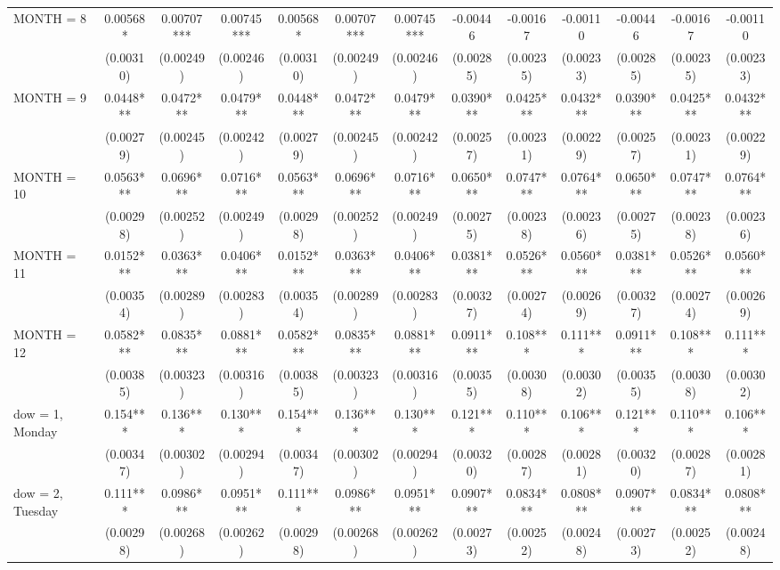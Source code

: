 \begin{tabular}{lcccccccccccc}
MONTH = 8 & 0.00568* & 0.00707*** & 0.00745*** & 0.00568* & 0.00707*** & 0.00745*** & -0.00446 & -0.00167 & -0.00110 & -0.00446 & -0.00167 & -0.00110 \\
 & (0.00310) & (0.00249) & (0.00246) & (0.00310) & (0.00249) & (0.00246) & (0.00285) & (0.00235) & (0.00233) & (0.00285) & (0.00235) & (0.00233) \\
MONTH = 9 & 0.0448*** & 0.0472*** & 0.0479*** & 0.0448*** & 0.0472*** & 0.0479*** & 0.0390*** & 0.0425*** & 0.0432*** & 0.0390*** & 0.0425*** & 0.0432*** \\
 & (0.00279) & (0.00245) & (0.00242) & (0.00279) & (0.00245) & (0.00242) & (0.00257) & (0.00231) & (0.00229) & (0.00257) & (0.00231) & (0.00229) \\
MONTH = 10 & 0.0563*** & 0.0696*** & 0.0716*** & 0.0563*** & 0.0696*** & 0.0716*** & 0.0650*** & 0.0747*** & 0.0764*** & 0.0650*** & 0.0747*** & 0.0764*** \\
 & (0.00298) & (0.00252) & (0.00249) & (0.00298) & (0.00252) & (0.00249) & (0.00275) & (0.00238) & (0.00236) & (0.00275) & (0.00238) & (0.00236) \\
MONTH = 11 & 0.0152*** & 0.0363*** & 0.0406*** & 0.0152*** & 0.0363*** & 0.0406*** & 0.0381*** & 0.0526*** & 0.0560*** & 0.0381*** & 0.0526*** & 0.0560*** \\
 & (0.00354) & (0.00289) & (0.00283) & (0.00354) & (0.00289) & (0.00283) & (0.00327) & (0.00274) & (0.00269) & (0.00327) & (0.00274) & (0.00269) \\
MONTH = 12 & 0.0582*** & 0.0835*** & 0.0881*** & 0.0582*** & 0.0835*** & 0.0881*** & 0.0911*** & 0.108*** & 0.111*** & 0.0911*** & 0.108*** & 0.111*** \\
 & (0.00385) & (0.00323) & (0.00316) & (0.00385) & (0.00323) & (0.00316) & (0.00355) & (0.00308) & (0.00302) & (0.00355) & (0.00308) & (0.00302) \\
dow = 1, Monday & 0.154*** & 0.136*** & 0.130*** & 0.154*** & 0.136*** & 0.130*** & 0.121*** & 0.110*** & 0.106*** & 0.121*** & 0.110*** & 0.106*** \\
 & (0.00347) & (0.00302) & (0.00294) & (0.00347) & (0.00302) & (0.00294) & (0.00320) & (0.00287) & (0.00281) & (0.00320) & (0.00287) & (0.00281) \\
dow = 2, Tuesday & 0.111*** & 0.0986*** & 0.0951*** & 0.111*** & 0.0986*** & 0.0951*** & 0.0907*** & 0.0834*** & 0.0808*** & 0.0907*** & 0.0834*** & 0.0808*** \\
 & (0.00298) & (0.00268) & (0.00262) & (0.00298) & (0.00268) & (0.00262) & (0.00273) & (0.00252) & (0.00248) & (0.00273) & (0.00252) & (0.00248) \\

\end{tabular}
